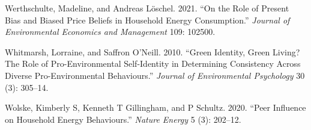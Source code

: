\documentclass[
  11pt,
]{article}
\newlength{\cslhangindent}
\newlength{\cslentryspacingunit} %
\newenvironment{CSLReferences}[2] %
 {%
  \setlength{\parindent}{0pt}
  \ifodd #1
  \let\oldpar\par
  \def\par{\hangindent=\cslhangindent\oldpar}
  \fi
  \setlength{\parskip}{#2\cslentryspacingunit}
 }%
 {}
\begin{document}
\begin{CSLReferences}{1}{0}
\leavevmode{}%
Werthschulte, Madeline, and Andreas Löschel. 2021. {``On the Role of
Present Bias and Biased Price Beliefs in Household Energy
Consumption.''} \emph{Journal of Environmental Economics and Management}
109: 102500.

\leavevmode{}%
Whitmarsh, Lorraine, and Saffron O'Neill. 2010. {``Green Identity, Green
Living? The Role of Pro-Environmental Self-Identity in Determining
Consistency Across Diverse Pro-Environmental Behaviours.''}
\emph{Journal of Environmental Psychology} 30 (3): 305--14.

\leavevmode{}%
Wolske, Kimberly S, Kenneth T Gillingham, and P Schultz. 2020. {``Peer
Influence on Household Energy Behaviours.''} \emph{Nature Energy} 5 (3):
202--12.

\end{CSLReferences}

\end{document}
